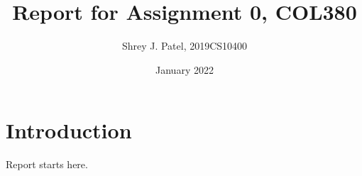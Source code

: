 \documentclass{article}
\title{Report for Assignment 0, COL380}
\author{Shrey J. Patel, 2019CS10400}
\date{January 2022}
\begin{document}
    \maketitle

    \section{Introduction}
    Report starts here.
\end{document}
